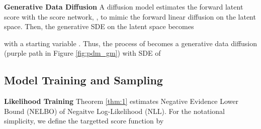 \documentclass{article}
\theoremstyle{definition}
\theoremstyle{remark}
\begin{document}
	\textbf{Generative Data Diffusion} A diffusion model estimates the forward latent score  with the score network, , to mimic the forward linear diffusion on the latent space. Then, the generative SDE on the latent space becomes 
	
	with a starting variable . Thus, the process  of  becomes a generative data diffusion (purple path in Figure \ref{fig:pdm_gm}) with SDE of
	 
	
	
	
	\subsection{Model Training and Sampling}
	
	\textbf{Likelihood Training} Theorem \ref{thm:1} estimates Negative Evidence Lower Bound (NELBO) of Negaitve Log-Likelihood (NLL). For the notational simplicity, we define the targetted score function by
	
\end{document}
